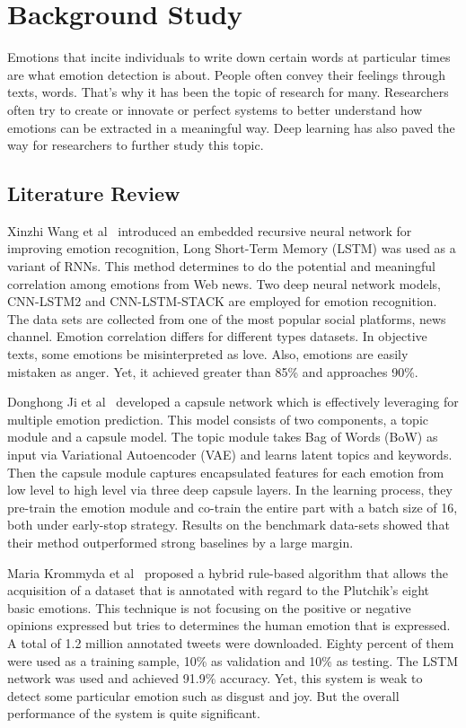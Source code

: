 \chapter{Background Study} \label{ch:literature_review}


Emotions that incite individuals to write down certain words at particular times are what emotion detection is about. People often convey their feelings through texts, words. That's why it has been the topic of research for many. Researchers often try to create or innovate or perfect systems to better understand how emotions can be extracted in a meaningful way. Deep learning has also paved the way for researchers to further study this topic.
\section{Literature Review}



Xinzhi Wang et al~\cite{ref1} introduced an embedded recursive neural network for improving emotion recognition, Long Short-Term Memory (LSTM) was used as a variant of RNNs. This method determines to do the potential and meaningful correlation among emotions from Web news. Two deep neural network models, CNN-LSTM2 and CNN-LSTM-STACK are employed for emotion recognition. The data sets are collected from one of the most popular social platforms, news channel. Emotion correlation differs for different types datasets. In objective texts, some emotions be misinterpreted as love. Also, emotions are easily mistaken as anger. Yet, it achieved greater than 85\% and approaches 90\%.



Donghong Ji et al~\cite{ref2} developed a capsule network which is effectively leveraging for multiple emotion prediction. This model consists of two components, a topic module and a capsule model. The topic module takes Bag of Words (BoW) as input via Variational Autoencoder (VAE) and learns latent topics and keywords. Then the capsule module captures encapsulated features for each emotion from low level to high level via three deep capsule layers. In the learning process, they pre-train the emotion module and co-train the entire part with a batch size of 16, both under early-stop strategy. Results on the benchmark data-sets showed that their method outperformed strong baselines by a large margin.

Maria Krommyda et al~\cite{ref3} proposed a hybrid rule-based algorithm that allows the acquisition of a dataset that is annotated with regard to the Plutchik's eight basic emotions. This technique is not focusing on the positive or negative opinions expressed but tries to determines the human emotion that is expressed. A total of 1.2 million annotated tweets were downloaded. Eighty percent of them were used as a training sample, 10\% as validation and 10\% as testing. The LSTM network was used and achieved 91.9\% accuracy. Yet, this system is weak to detect some particular emotion such as disgust and joy. But the overall performance of the system is quite significant. 

